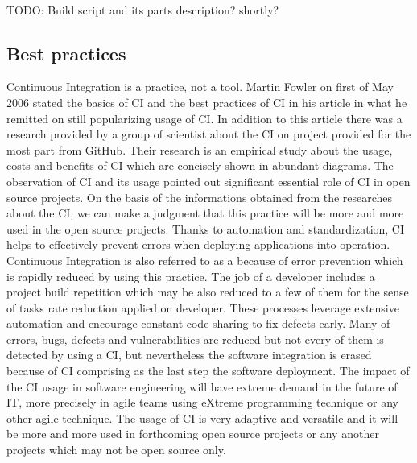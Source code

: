 \hfill\\
{\color{red}TODO: Build script and its parts description? shortly?}

\subsection{Best practices}

Continuous Integration is a practice, not a tool\cite{CollabNet}. Martin Fowler on first of May 2006 stated the basics of CI and the best practices of CI in his article in what he remitted on still popularizing usage of CI. In addition to this article there was a research provided by a group of scientist about the CI on project provided for the most part from GitHub. Their research is an empirical study about the usage, costs and benefits of CI which are concisely shown in abundant diagrams. The observation of CI and its usage pointed out significant essential role of CI in open source projects. On the basis of the informations obtained from the researches about the CI, we can make a judgment that this practice will be more and more used in the open source projects. Thanks to automation and standardization, CI helps to effectively prevent errors when deploying applications into operation\cite{CIcure}.\\

Continuous Integration is also referred to as a \cite{CIcure} because of error prevention which is rapidly reduced by using this practice. The job of a developer includes a project build repetition which may be also reduced to a few of them for the sense of tasks rate reduction applied on developer. These processes leverage extensive automation and encourage constant code sharing to fix defects early\cite{DigitalOceanCI}. Many of errors, bugs, defects and vulnerabilities are reduced but not every of them is detected by using a CI, but nevertheless the software integration is erased because of CI comprising as the last step the software deployment. The impact of the CI usage in software engineering will have extreme demand in the future of IT, more precisely in agile teams using eXtreme programming technique or any other agile technique. The usage of CI is very adaptive and versatile and it will be more and more used in forthcoming open source projects or any another projects which may not be open source only.\\

